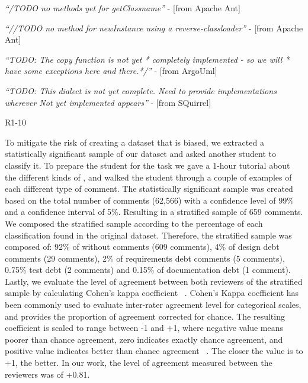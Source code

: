 {\vspace{1mm}
    \begin{displayquote}
        \textit{``/TODO no methods yet for getClassname''} - [from Apache Ant]
    \end{displayquote}
    \vspace{1mm}
    \begin{displayquote}
        \textit{``//TODO no method for newInstance using a reverse-classloader''} - [from Apache Ant]
    \end{displayquote}
    \vspace{1mm}
    \begin{displayquote}
        \textit{``TODO: The copy function is not yet * completely implemented - so we will  * have some exceptions here and there.*/''} - [from ArgoUml]  
    \end{displayquote}
    \vspace{1mm}
    \begin{displayquote}
        \textit{``TODO: This dialect is not yet complete. Need to provide implementations wherever \textit{Not yet implemented} appears''} - [from SQuirrel]  
    \end{displayquote}
    \vspace{1mm}
\vspace{1mm}  

}{R1-10}

To mitigate the risk of creating a dataset that is biased, we extracted a statistically significant sample of our dataset and asked another student to classify it. To prepare the student for the task we gave a 1-hour tutorial about the different kinds of \SATD, and walked the student through a couple of examples of each different type of \SATD comment. The statistically significant sample was created based on the total number of comments (62,566) with a confidence level of 99\% and a confidence interval of 5\%. Resulting in a stratified sample of 659 comments. We composed the stratified sample according to the percentage of each classification found in the original dataset. Therefore, the stratified sample was composed of: 92\% of without \SATD comments (609 comments), 4\% of design debt comments (29 comments), 2\% of requirements debt comments (5 comments), 0.75\% test debt (2 comments) and 0.15\% of documentation debt (1 comment). Lastly, we evaluate the level of agreement between both reviewers of the stratified sample by calculating Cohen's kappa coefficient ~\cite{cohen1960coefficient}. Cohen's Kappa coefficient has been commonly used to evaluate inter-rater agreement level for categorical scales, and provides the proportion of agreement corrected for chance. The resulting coefficient is scaled to range between -1 and +1, where negative value means poorer than chance agreement, zero indicates exactly chance agreement, and positive value indicates better than chance agreement ~\cite{fleiss1973equivalence}. The closer the value is to +1, the better. In our work, the level of agreement measured between the reviewers was of +0.81.

